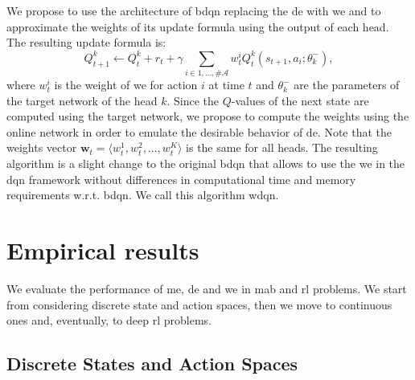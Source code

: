 We propose to use the architecture of \gls{bdqn} replacing the \gls{de} with \gls{we} and to approximate the weights of its update formula using the output of each head. The resulting update formula is:
\begin{equation}
Q_{t+1}^k \leftarrow Q_t^k + r_t + \gamma \sum_{i \in {1, \dots, \#\mathcal{A}}} w_t^i Q_t^k(s_{t+1}, a_i; \theta_k^-),
\end{equation}
where $w_t^i$ is the weight of \gls{we} for action $i$ at time $t$ and $\theta_k^-$ are the parameters of the target network of the head $k$. Since the $Q$-values of the next state are computed using the target network, we propose to compute the weights using the online network in order to emulate the desirable behavior of \gls{de}. Note that the weights vector $\mathbf{w}_t = \langle w_t^1, w_t^2, \dots, w_t^K \rangle$ is the same for all heads.
The resulting algorithm is a slight change to the original \gls{bdqn} that allows to use the \gls{we} in the \gls{dqn} framework without differences in computational time and memory requirements w.r.t. \gls{bdqn}. We call this algorithm \gls{wdqn}.

\section{Empirical results}
We evaluate the performance of \gls{me}, \gls{de} and \gls{we} in \gls{mab} and \gls{rl} problems. We start from considering discrete state and action spaces, then we move to continuous ones and, eventually, to deep \gls{rl} problems.

\subsection{Discrete States and Action Spaces}

